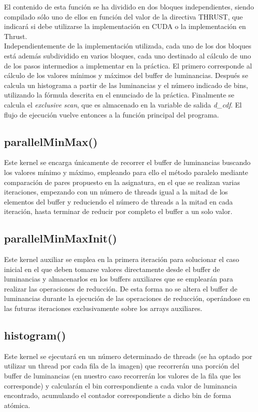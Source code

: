 \documentclass[10pt,oneside,a4paper]{article}
\begin{document}
El contenido de esta función se ha dividido en dos bloques independientes, siendo compilado sólo uno de ellos en función del valor de la directiva THRUST, que indicará si debe utilizarse la implementación en CUDA o la implementación en Thrust.\\

Independientemente de la implementación utilizada, cada uno de los dos bloques está además subdividido en varios bloques, cada uno destinado al cálculo de uno de los pasos intermedios a implementar en la práctica. El primero corresponde al cálculo de los valores mínimos y máximos del buffer de luminancias. Después se calcula un histograma a partir de las luminancias y el número indicado de bins, utilizando la fórmula descrita en el enunciado de la práctica. Finalmente se calcula el \textit{exclusive scan}, que es almacenado en la variable de salida \textit{d\_cdf}. El flujo de ejecución vuelve entonces a la función principal del programa.

\subsection{parallelMinMax()}
Este kernel se encarga únicamente de recorrer el buffer de luminancias buscando los valores mínimo y máximo, empleando para ello el método paralelo mediante comparación de pares propuesto en la asignatura, en el que se realizan varias iteraciones, empezando con un número de threads igual a la mitad de los elementos del buffer y reduciendo el número de threads a la mitad en cada iteración, hasta terminar de reducir por completo el buffer a un solo valor.

\subsection{parallelMinMaxInit()}
Este kernel auxiliar se emplea en la primera iteración para solucionar el caso inicial en el que deben tomarse valores directamente desde el buffer de luminancias y almacenarlos en los buffers auxiliares que se emplearán para realizar las operaciones de reducción. De esta forma no se altera el buffer de luminancias durante la ejecución de las operaciones de reducción, operándose en las futuras iteraciones exclusivamente sobre los arrays auxiliares.

\subsection{histogram()}
Este kernel se ejecutará en un número determinado de threads (se ha optado por utilizar un thread por cada fila de la imagen) que recorrerán una porción del buffer de luminancias (en nuestro caso recorrerán los valores de la fila que les corresponde) y calcularán el bin correspondiente a cada valor de luminancia encontrado, acumulando el contador correspondiente a dicho bin de forma atómica.
\end{document}
